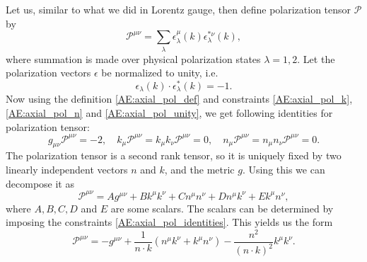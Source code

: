\documentclass[a4paper, twoside, english, 12pt]{article}
\begin{document}
Let us, similar to what we did in Lorentz gauge, then define polarization tensor $\mathcal{P}$ by
\begin{equation}\label{AE:axial_pol_def}
	\mathcal{P}^{\mu\nu} = \sum\limits_{\lambda} \epsilon^\mu_\lambda(k)\epsilon^{*\nu}_\lambda(k),
\end{equation}
where summation is made over physical polarization states $\lambda=1,2$. Let the polarization vectors $\epsilon$ be normalized to unity, i.e.
\begin{equation}\label{AE:axial_pol_unity}
	\epsilon_\lambda(k)\cdot \epsilon^{*}_\lambda(k)=-1.
\end{equation}
Now using the definition \eqref{AE:axial_pol_def} and constraints \eqref{AE:axial_pol_k}, \eqref{AE:axial_pol_n} and \eqref{AE:axial_pol_unity}, we get following identities for polarization tensor:
\begin{equation}\label{AE:axial_pol_identities}
	g_{\mu\nu}\mathcal{P}^{\mu\nu}=-2, \quad k_{\mu}\mathcal{P}^{\mu\nu}=k_{\mu}k_{\nu}\mathcal{P}^{\mu\nu}= 0 , \quad n_{\mu}\mathcal{P}^{\mu\nu}=n_{\mu}n_{\nu}\mathcal{P}^{\mu\nu}= 0 .
\end{equation}
The polarization tensor is a second rank tensor, so it is uniquely fixed by two linearly independent vectors $n$ and $k$, and the metric $g$. Using this we can decompose it as
\begin{equation}
	\mathcal{P}^{\mu\nu} = Ag^{\mu\nu} + Bk^{\mu}k^{\nu}+ Cn^{\mu}n^{\nu} + Dn^{\mu}k^{\nu} + Ek^{\mu}n^{\nu},
\end{equation}
where $A,B,C,D$ and $E$ are some scalars. The scalars can be determined by imposing the constraints \eqref{AE:axial_pol_identities}. This yields us the form
\begin{equation}
\mathcal{P}^{\mu\nu} = -g^{\mu\nu} + \frac{1}{n\cdot k}\left(n^{\mu}k^{\nu} + k^{\mu}n^{\nu}\right) - \frac{n^2}{\left(n\cdot k\right)^2}k^{\mu}k^{\nu}.
\end{equation}
\end{document}
